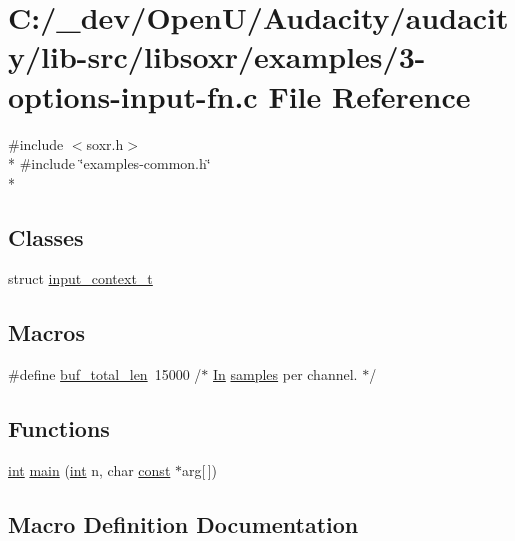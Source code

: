 \hypertarget{3-options-input-fn_8c}{}\section{C\+:/\+\_\+dev/\+Open\+U/\+Audacity/audacity/lib-\/src/libsoxr/examples/3-\/options-\/input-\/fn.c File Reference}
\label{3-options-input-fn_8c}
{\ttfamily \#include $<$soxr.\+h$>$}\\*
{\ttfamily \#include \char`\"{}examples-\/common.\+h\char`\"{}}\\*
\subsection*{Classes}
\begin{DoxyCompactItemize}
\item 
struct \hyperlink{structinput__context__t}{input\+\_\+context\+\_\+t}
\end{DoxyCompactItemize}
\subsection*{Macros}
\begin{DoxyCompactItemize}
\item 
\#define \hyperlink{3-options-input-fn_8c_a58c391d4fe581fb9e15cf5c89099f1d7}{buf\+\_\+total\+\_\+len}~15000  /$\ast$ \hyperlink{devicetopology_8h_aab6c7474a070d22bf61ccf21b532412fad8ff8dfc9381018e97fce86d909f8975}{In} \hyperlink{test__w__saw8_8c_a54185623a5a093f671a73e5fba6197a1}{samples} per channel. $\ast$/
\end{DoxyCompactItemize}
\subsection*{Functions}
\begin{DoxyCompactItemize}
\item 
\hyperlink{xmltok_8h_a5a0d4a5641ce434f1d23533f2b2e6653}{int} \hyperlink{3-options-input-fn_8c_a2948288d5a202a7f1bec9085b62efce2}{main} (\hyperlink{xmltok_8h_a5a0d4a5641ce434f1d23533f2b2e6653}{int} n, char \hyperlink{getopt1_8c_a2c212835823e3c54a8ab6d95c652660e}{const} $\ast$arg\mbox{[}$\,$\mbox{]})
\end{DoxyCompactItemize}


\subsection{Macro Definition Documentation}

